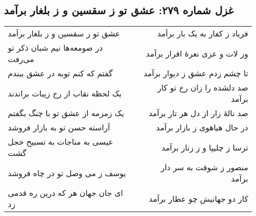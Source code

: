 \begin{center}
\section*{غزل شماره ۲۷۹: عشق تو ز سقسین و ز بلغار برآمد}
\label{sec:279}
\begin{longtable}{l p{0.5cm} r}
عشق تو ز سقسین و ز بلغار برآمد
&&
فریاد ز کفار به یک بار برآمد
\\
در صومعه‌ها نیم شبان ذکر تو می‌رفت
&&
وز لات و عزی نعرهٔ اقرار برآمد
\\
گفتم که کنم توبه در عشق ببندم
&&
تا چشم زدم عشق ز دیوار برآمد
\\
یک لحظه نقاب از رخ زیبات براندند
&&
صد دلشده را زان رخ تو کار برآمد
\\
یک زمزمه از عشق تو با چنگ بگفتم
&&
صد نالهٔ زار از دل هر تار برآمد
\\
آراسته حسن تو به بازار فروشد
&&
در حال هیاهوی ز بازار برآمد
\\
عیسی به مناجات به تسبیح خجل گشت
&&
ترسا ز چلیپا و ز زنار برآمد
\\
یوسف ز می وصل تو در چاه فروشد
&&
منصور ز شوقت به سر دار برآمد
\\
ای جان جهان هر که درین ره قدمی زد
&&
کار دو جهانیش چو عطار برآمد
\\
\end{longtable}
\end{center}
